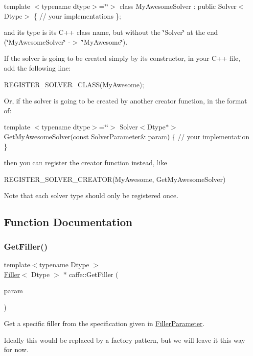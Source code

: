 template $<$typename dtype$>$=\char`\"{}\char`\"{}$>$ class My\+Awesome\+Solver \+: public Solver$<$\+Dtype$>$ \{ // your implementations \};

and its type is its C++ class name, but without the \char`\"{}\+Solver\char`\"{} at the end (\char`\"{}\+My\+Awesome\+Solver\char`\"{} -\/$>$ \char`\"{}\+My\+Awesome\char`\"{}).

If the solver is going to be created simply by its constructor, in your C++ file, add the following line\+:

R\+E\+G\+I\+S\+T\+E\+R\+\_\+\+S\+O\+L\+V\+E\+R\+\_\+\+C\+L\+A\+S\+S(\+My\+Awesome);

Or, if the solver is going to be created by another creator function, in the format of\+:

template $<$typename dtype$>$=\char`\"{}\char`\"{}$>$ Solver$<$\+Dtype$\ast$$>$ Get\+My\+Awesome\+Solver(const Solver\+Parameter\& param) \{ // your implementation \}

then you can register the creator function instead, like

R\+E\+G\+I\+S\+T\+E\+R\+\_\+\+S\+O\+L\+V\+E\+R\+\_\+\+C\+R\+E\+A\+T\+O\+R(\+My\+Awesome, Get\+My\+Awesome\+Solver)

Note that each solver type should only be registered once. 

\subsection{Function Documentation}
\mbox{\label{namespacecaffe_a90854398629899a1cd21231df3beb9cb}} 
\subsubsection{\texorpdfstring{Get\+Filler()}{GetFiller()}}
{\footnotesize\ttfamily template$<$typename Dtype $>$ \\
\mbox{\hyperlink{classcaffe_1_1_filler}{Filler}}$<$ Dtype $>$ $\ast$ caffe\+::\+Get\+Filler (\begin{DoxyParamCaption}\item[{const \mbox{\hyperlink{classcaffe_1_1_filler_parameter}{Filler\+Parameter}} \&}]{param }\end{DoxyParamCaption})}



Get a specific filler from the specification given in \mbox{\hyperlink{classcaffe_1_1_filler_parameter}{Filler\+Parameter}}. 

Ideally this would be replaced by a factory pattern, but we will leave it this way for now. 